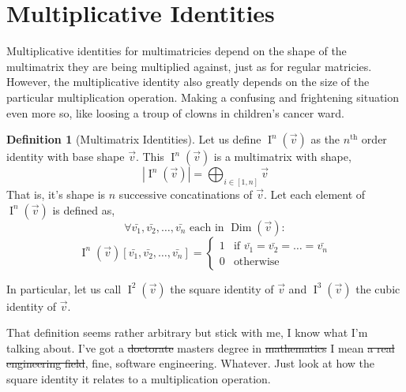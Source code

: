 \documentclass[12pt]{book}
\theoremstyle{plain}
\theoremstyle{definition}
\newtheorem{definition}{Definition}[chapter]
\theoremstyle{ppart}
\theoremstyle{case}
\theoremstyle{solution}
\DeclareMathOperator{\Dim}{Dim}
\DeclareMathOperator{\Ident}{I}
\begin{document}
\section{Multiplicative Identities}

Multiplicative identities for multimatricies depend on the shape of the
multimatrix they are being multiplied against, just as for regular matricies.
However, the multiplicative identity also greatly depends on the size of
the particular multiplication operation. Making a confusing and frightening
situation even more so, like loosing a troup of clowns in children's cancer ward.

\begin{definition}[Multimatrix Identities]
\label{mm_mult_ident}
Let us define $\Ident^n(\vec{v})$ as the $n^{\text{th}}$ order identity with base shape
$\vec{v}$. This $\Ident^n(\vec{v})$ is a multimatrix with shape,
\[ |\Ident^n(\vec{v})| = \bigoplus_{i \in [1, n]} \vec{v} \]
That is, it's shape is $n$ successive concatinations of $\vec{v}$.
Let each element of $\Ident^n(\vec{v})$ is defined as,
\[ \forall \bar{v_1}, \bar{v_2}, \ldots, \bar{v_n} \text{ each in } \Dim(\vec{v}) : \]
\[
 \Ident^n(\vec{v})[\bar{v_1}, \bar{v_2}, \ldots, \bar{v_n}]
 = \left\{
  \begin{array}{ll}
    1 & \mbox{if } \bar{v_1} = \bar{v_2} = \ldots = \bar{v_n} \\
    0 & \mbox{otherwise}
  \end{array}
 \right.
\]

In particular, let us call $\Ident^2(\vec{v})$ the square identity of $\vec{v}$ and
$\Ident^3(\vec{v})$ the cubic identity of $\vec{v}$.
\end{definition}

That definition seems rather arbitrary but stick with me, I know what I'm
talking about. I've got a \sout{doctorate}
masters degree in \sout{mathematics} I mean \sout{a real engineering field}, fine, software
engineering. Whatever. Just look at how the
square identity it relates to a multiplication operation.
\end{document}
